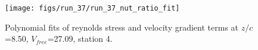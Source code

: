 \begin{figure}[H]
\centering
\texttt{[image: figs/run\_37/run\_37\_nut\_ratio\_fit]}
\caption{Polynomial fits of reynolds stress and velocity gradient terms at $z/c$=8.50, $V_{free}$=27.09, station 4.}
\label{fig:run_37_nut_ratio_fit}
\end{figure}


